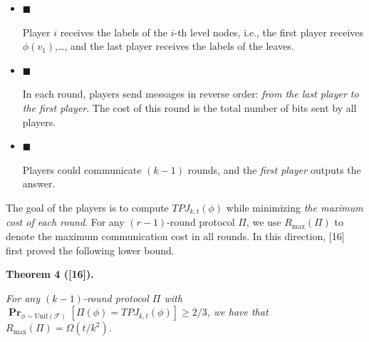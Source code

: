 \begin{itemize}


\item[] 
$\blacksquare$ 


Player $i$ receives the labels of the $i$-th level nodes, i.e., the first player receives $\phi(v_{1})$,…, and the last player receives the labels of the leaves.\par





\item[] 
$\blacksquare$ 


In each round, players send messages in reverse order: \emph{from the last player to the first player}. The cost of this round is the total number of bits sent by all players.\par





\item[] 
$\blacksquare$ 


Players could communicate $(k-1)$ rounds, and the \emph{first player} outputs the answer.\par





\end{itemize}




The goal of the players is to compute $TPJ_{k,t}(\phi)$ while minimizing \emph{the maximum cost of each round}. For any $(r-1)$-round protocol $\Pi$, we use $R_{\max}(\Pi)$ to denote the maximum communication cost in all rounds. In this direction, [16] first proved the following lower bound.\par





\par\medskip\noindent\textbf{
\textbf{Theorem 4}\textbf{ }([16])\textbf{.}
}\par



\emph{For any $(k-1)$-round protocol $\Pi$ with
$\operatorname*{\mathbf{Pr}}_{\phi\sim\mathrm{Unif}(\mathcal{F})}[\Pi(\phi)=TPJ_{k,t}(\phi)]\geq 2/3$,
we have that $R_{\max}(\Pi)=\Omega(t/k^{2}).$}\par






